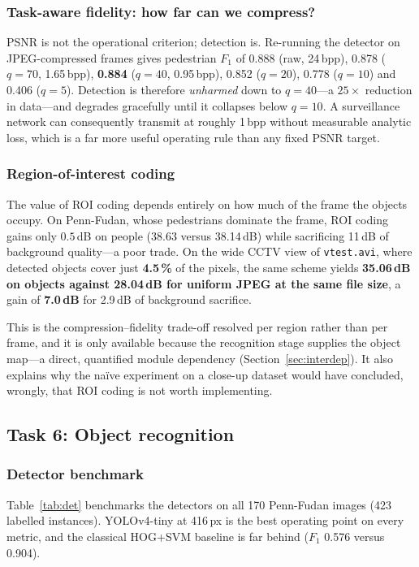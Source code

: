 \documentclass[conference,10pt]{IEEEtran}
\begin{document}
\subsubsection{Task-aware fidelity: how far can we compress?}
PSNR is not the operational criterion; detection is. Re-running the detector on
JPEG-compressed frames gives pedestrian $F_1$ of 0.888 (raw, 24\,bpp), 0.878
($q{=}70$, 1.65\,bpp), \textbf{0.884} ($q{=}40$, 0.95\,bpp), 0.852
($q{=}20$), 0.778 ($q{=}10$) and 0.406 ($q{=}5$). Detection is therefore
\emph{unharmed} down to $q{=}40$---a $25\times$ reduction in data---and degrades
gracefully until it collapses below $q{=}10$. A surveillance network can
consequently transmit at roughly 1\,bpp without measurable analytic loss, which
is a far more useful operating rule than any fixed PSNR target.

\subsubsection{Region-of-interest coding}
The value of ROI coding depends entirely on how much of the frame the objects
occupy. On Penn-Fudan, whose pedestrians dominate the frame, ROI coding gains
only $0.5$\,dB on people (38.63 versus 38.14\,dB) while sacrificing 11\,dB of
background quality---a poor trade. On the wide CCTV view of
\texttt{vtest.avi}, where detected objects cover just \textbf{4.5\,\%} of the
pixels, the same scheme yields \textbf{35.06\,dB on objects against 28.04\,dB
for uniform JPEG at the same file size}, a gain of \textbf{7.0\,dB} for
2.9\,dB of background sacrifice.

This is the compression--fidelity trade-off resolved per region rather than per
frame, and it is only available because the recognition stage supplies the
object map---a direct, quantified module dependency
(Section~\ref{sec:interdep}). It also explains why the na\"ive experiment on a
close-up dataset would have concluded, wrongly, that ROI coding is not worth
implementing.

\subsection{Task 6: Object recognition}\label{sec:res-rec}
\subsubsection{Detector benchmark}
Table~\ref{tab:det} benchmarks the detectors on all 170 Penn-Fudan images
(423 labelled instances). YOLOv4-tiny at 416\,px is the best operating point on
every metric, and the classical HOG+SVM baseline is far behind
($F_1$ 0.576 versus 0.904).
\end{document}
